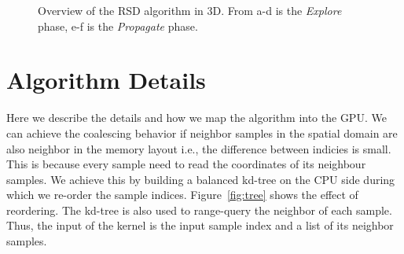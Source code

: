 \documentclass[12pt] {article}
\begin{document}
\begin{figure}[!tbh]
\centering        
   \caption{Overview of the RSD algorithm in 3D. From a-d is the \emph{Explore} phase, e-f is the \emph{Propagate} phase.}
   \label{fig:algo}
\end{figure}

\section*{Algorithm Details}
Here we describe the details and how we map the algorithm into the GPU. 
We can achieve the coalescing behavior if neighbor samples in the spatial domain are also neighbor in the memory layout i.e., the difference between indicies is small. This is because every sample need to read the coordinates of its neighbour samples. We achieve this by building a balanced kd-tree on the CPU side during which we re-order the sample indices. Figure~\ref{fig:tree} shows the effect of reordering. The kd-tree is also used to range-query the neighbor of each sample. Thus, the input of the kernel is the input sample index and a list of its neighbor samples. 
\end{document}
